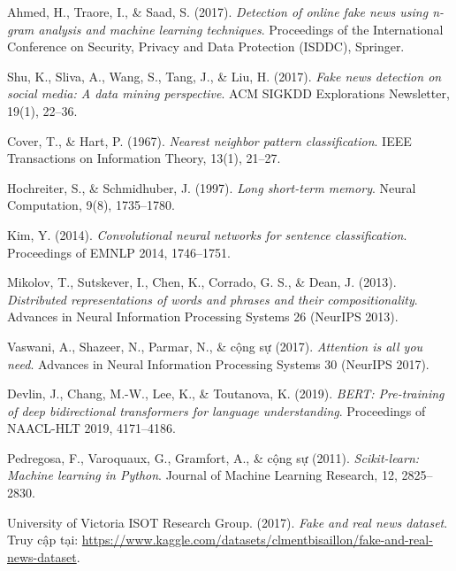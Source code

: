 \begin{enumerate}[label={[\arabic*]}, resume]
    \item \label{ahmed2017} Ahmed, H., Traore, I., \& Saad, S. (2017). \textit{Detection of online fake news using n-gram analysis and machine learning techniques}. Proceedings of the International Conference on Security, Privacy and Data Protection (ISDDC), Springer.
    \item \label{shu2017} Shu, K., Sliva, A., Wang, S., Tang, J., \& Liu, H. (2017). \textit{Fake news detection on social media: A data mining perspective}. ACM SIGKDD Explorations Newsletter, 19(1), 22--36.
    \item \label{coverhart} Cover, T., \& Hart, P. (1967). \textit{Nearest neighbor pattern classification}. IEEE Transactions on Information Theory, 13(1), 21--27.
    \item \label{lstm} Hochreiter, S., \& Schmidhuber, J. (1997). \textit{Long short-term memory}. Neural Computation, 9(8), 1735--1780.
    \item \label{kim2014} Kim, Y. (2014). \textit{Convolutional neural networks for sentence classification}. Proceedings of EMNLP 2014, 1746--1751.
    \item \label{word2vec} Mikolov, T., Sutskever, I., Chen, K., Corrado, G. S., \& Dean, J. (2013). \textit{Distributed representations of words and phrases and their compositionality}. Advances in Neural Information Processing Systems 26 (NeurIPS 2013).
    \item \label{transformer} Vaswani, A., Shazeer, N., Parmar, N., \& cộng sự (2017). \textit{Attention is all you need}. Advances in Neural Information Processing Systems 30 (NeurIPS 2017).
    \item \label{bert} Devlin, J., Chang, M.-W., Lee, K., \& Toutanova, K. (2019). \textit{BERT: Pre-training of deep bidirectional transformers for language understanding}. Proceedings of NAACL-HLT 2019, 4171--4186.
    \item \label{sklearn} Pedregosa, F., Varoquaux, G., Gramfort, A., \& cộng sự (2011). \textit{Scikit-learn: Machine learning in Python}. Journal of Machine Learning Research, 12, 2825--2830.
    \item \label{dataset} University of Victoria ISOT Research Group. (2017). \textit{Fake and real news dataset}. Truy cập tại: \url{https://www.kaggle.com/datasets/clmentbisaillon/fake-and-real-news-dataset}.
\end{enumerate}
